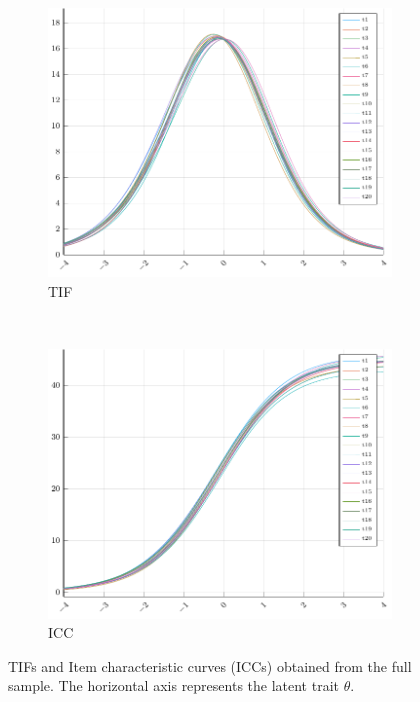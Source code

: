 \begin{figure}[H]
	
	\centering
	\begin{subfigure}[t]{0.8\textwidth}	
		\centering
		\includegraphics[width=\linewidth]{Figures/real/TIFPlot.pdf}
		\caption{TIF}
	\end{subfigure}\\
	\begin{subfigure}[t]{0.8\textwidth}
		\centering
		\includegraphics[width=\linewidth]{Figures/real/ICFPlot.pdf}
		\caption{ICC}
	\end{subfigure}
	\caption{TIFs and Item characteristic curves (ICCs) obtained from the full sample. The horizontal axis represents the latent trait $\theta$. \label{fig:taTIFICF}}
\end{figure}
